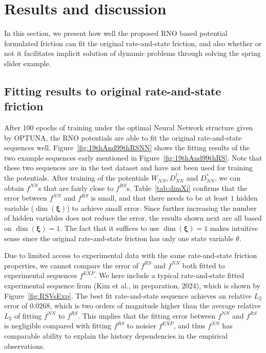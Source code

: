 \section{Results and discussion}
\label{sec:resultsAndDiscussion}
In this section, 
we present how well the proposed RNO based potential formulated friction can fit the original rate-and-state friction, 
and also whether or not it facilitates implicit solution of dynamic problems through solving the spring slider example. 
\subsection{Fitting results to original rate-and-state friction}
After 100 epochs of training under the optimal Neural Network structure given by OPTUNA, 
the RNO potentials are able to fit the original rate-and-state sequences well. 
Figure~\ref{fig:19thAnd99thRSNN} shows the fitting results of the two example sequences early mentioned in Figure~\ref{fig:19thAnd99thRS}. 
Note that these two sequences are in the test dataset and have not been used for training the potentials. 
After training of the potentials $W_{NN}, D^\dagger_{NN}$ and $D^*_{NN}$, 
we can obtain $f^{NN}$s that are fairly close to $f^{RS}$s. 
Table~\ref{tab:dimXi} confirms that the error between $f^{NN}$ and $f^{RS}$ is small, 
and that there needs to be at least $1$ hidden variable ($\dim(\bm{\xi})$) to achieve small error. 
Since further increasing the number of hidden variables does not reduce the error, 
the results shown next are all based on $\dim(\bm{\xi}) = 1$. 
The fact that it suffices to use $\dim(\bm{\xi}) = 1$ makes intuitive sense since the original rate-and-state friction has only one state variable $\theta$. 

Due to limited access to experimental data with the same rate-and-state friction properties, 
we cannot compare the error of $f^{RS}$ and $f^{NN}$ both fitted to 
experimental sequences $f^{EXP}$. 
We here include a typical rate-and-state fitted experimental sequence from (Kim et al., in preparation, 2024), 
which is shown by Figure~\ref{fig:RSVsExp}. 
The best fit rate-and-state sequence achieves an relative $L_2$ error of $0.0268$, 
which is two orders of magnitude higher than the average relative $L_2$ of fitting $f^{NN}$ to $f^{RS}$. 
This implies that the fitting error between $f^{NN}$ and $f^{RS}$ is negligible compared with fitting $f^{RS}$ to noisier $f^{EXP}$, 
and thus $f^{NN}$ has comparable ability to explain the history dependencies in the empirical observations. 

